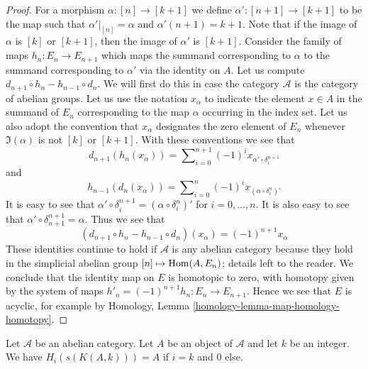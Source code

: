\begin{proof}
For a morphism $\alpha : [n] \to [k + 1]$
we define $\alpha' : [n + 1] \to [k + 1]$ to be
the map such that $\alpha'|_{[n]} = \alpha$ and
$\alpha'(n + 1) = k + 1$. Note that if the
image of $\alpha$ is $[k]$ or $[k + 1]$, then
the image of $\alpha'$ is $[k + 1]$.
Consider the family of
maps $h_n : E_n \to E_{n + 1}$ which maps
the summand corresponding to $\alpha$ to
the summand corresponding to $\alpha'$ via
the identity on $A$.
Let us compute $d_{n + 1} \circ h_n - h_{n - 1} \circ d_n$.
We will first do this in case the category $\mathcal{A}$ is
the category of abelian groups.
Let us use the notation $x_\alpha$ to indicate
the element $x \in A$ in the summand of $E_n$ corresponding
to the map $\alpha$ occurring in the index set.
Let us also adopt the convention that
$x_\alpha$ designates the zero element of $E_n$
whenever $\Im(\alpha)$ is not $[k]$ or $[k + 1]$.
With these conventions we see that
$$
d_{n + 1}(h_n(x_\alpha)) =
\sum\nolimits_{i = 0}^{n + 1} (-1)^i x_{\alpha' \circ \delta^{n + 1}_i}
$$
and
$$
h_{n - 1}(d_n(x_\alpha)) =
\sum\nolimits_{i = 0}^n (-1)^i x_{(\alpha \circ \delta_i^n)'}
$$
It is easy to see that
$\alpha' \circ \delta^{n + 1}_i = (\alpha \circ \delta_i^n)'$
for $i = 0, \ldots, n$. It is also easy to see that
$\alpha' \circ \delta^{n + 1}_{n + 1} = \alpha$. Thus we
see that
$$
(d_{n + 1} \circ h_n - h_{n - 1} \circ d_n)(x_\alpha)
=
(-1)^{n + 1} x_\alpha
$$
These identities continue to hold if $\mathcal{A}$ is any abelian
category because they hold in the simplicial abelian group
$[n] \mapsto \mathop{\mathrm{Hom}}\nolimits(A, E_n)$; details left to the reader.
We conclude that the identity map on $E$ is
homotopic to zero, with homotopy given by the
system of maps $h'_n = (-1)^{n + 1}h_n : E_n \to E_{n + 1}$.
Hence we see that $E$ is acyclic, for
example by Homology, Lemma \ref{homology-lemma-map-homology-homotopy}.
\end{proof}

\begin{lemma}
\label{lemma-homology-eilenberg-maclane}
Let $\mathcal{A}$ be an abelian category.
Let $A$ be an object of $\mathcal{A}$ and
let $k$ be an integer. We have
$H_i(s(K(A, k))) = A$ if $i = k$ and
$0$ else.
\end{lemma}

